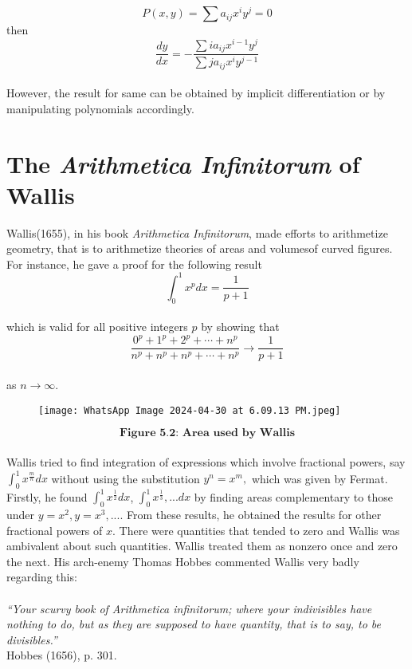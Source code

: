 \documentclass[a4paper,reqno,11pt]{amsart}
\theoremstyle{plain}%
\begin{document}
$$P(x,y) = \sum a_{ij}x^iy^j = 0$$
then \\
$$ \frac{dy}{dx} = -\frac{\sum ia_{ij}x^{i-1}y^j}{\sum ja_{ij}x^iy^{j-1}} $$
\\
\indent However, the result for same can be obtained by implicit differentiation or by manipulating polynomials accordingly.
\\
\section{ The \textit{Arithmetica Infinitorum} of Wallis}
Wallis(1655), in his book \textit{Arithmetica Infinitorum}, made efforts to arithmetize geometry, that is to arithmetize theories of areas and volumesof curved figures. For instance, he gave a proof for the following result\\
$$\int_{0}^{1}x^p dx = \frac{1}{p+1}$$
\\
which is valid for all positive integers $p$ by showing that \\
$$\frac{0^p + 1^p + 2^p + \cdots + n^p}{n^p + n^p + n^p + \cdots + n^p} \to \frac{1}{p+1}$$
\\
as $n \to \infty.$\\
\begin{figure}
\texttt{[image: WhatsApp Image 2024-04-30 at 6.09.13 PM.jpeg]}
\end{figure}
$$\textbf{Figure 5.2: Area used by Wallis}$$
\\
\indent Wallis tried to find integration of expressions which involve fractional powers, say $\int_{0}^{1}x^{\frac{m}{n}} dx$ without using the substitution $y^n = x^m,$ which was given by Fermat. Firstly, he found $\int_{0}^{1}x^{\frac{1}{2}} dx$, $\int_{0}^{1}x^{\frac{1}{3}},... dx$ by finding areas complementary to those under $y = x^2, y = x^3,....$ From these results, he obtained the results for other fractional powers of $x$.
\indent There were quantities that tended to zero and Wallis was ambivalent about
such quantities. Wallis treated them as nonzero once and
zero the next. His arch-enemy Thomas Hobbes commented Wallis very badly regarding this:\\
\\
\textit{``Your scurvy book of Arithmetica infinitorum; where
your indivisibles have nothing to do, but as they are supposed to have
quantity, that is to say, to be divisibles.”}\cite{ref 3}\\
\vspace{2ex}
\hfill{Hobbes (1656), p. 301.}\\
\end{document}
